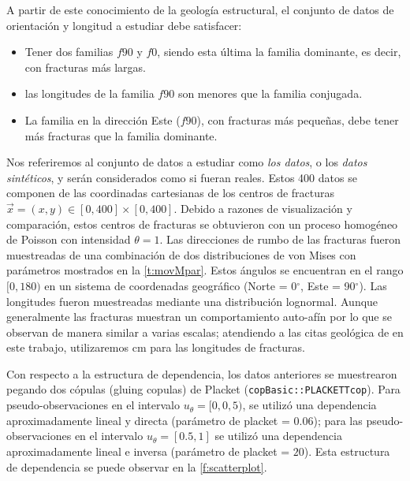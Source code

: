 A partir de este conocimiento de la geolog\'ia estructural, el conjunto de datos de orientaci\'on y longitud a estudiar debe satisfacer:

\begin{itemize}
	\item Tener dos familias $f90$ y $f0$, siendo esta \'ultima la familia dominante, es decir, con fracturas m\'as largas.
	\item las longitudes de la familia $f90$ son menores que la familia conjugada.
	\item La familia en la direcci\'on Este ($f90$), con fracturas m\'as peque\~nas, debe tener m\'as fracturas que la familia dominante.
\end{itemize}

Nos referiremos al conjunto de datos a estudiar como \textit{los datos}, o los \textit{datos sint\'eticos}, y ser\'an considerados como si fueran reales. Estos 400 datos se componen de las coordinadas cartesianas de los centros de fracturas $\vec{x} = (x,y) \in [0,400] \times [0,400]$.
Debido a razones de visualizaci\'on y comparaci\'on, estos centros de fracturas se obtuvieron con un proceso homog\'eneo de Poisson con intensidad $\theta = 1$.
Las direcciones de rumbo de las fracturas fueron muestreadas de una combinaci\'on de dos distribuciones de von Mises con par\'ametros mostrados en la \autoref{t:movMpar}.
Estos \'angulos se encuentran en el rango $[0, 180)$ en un sistema de coordenadas geogr\'afico (Norte = 0$^{\circ}$, Este = 90$^{\circ}$).
Las longitudes fueron muestreadas mediante una distribuci\'on lognormal.
Aunque generalmente las fracturas muestran un comportamiento auto-af\'in por lo que se observan de manera similar a varias escalas; atendiendo a las citas geol\'ogica de \citet{davis_structural_2011} en este trabajo, utilizaremos cm para las longitudes de fracturas.

Con respecto a la estructura de dependencia, los datos anteriores se muestrearon pegando dos c\'opulas (gluing copulas) de Placket (\verb|copBasic::PLACKETTcop|). Para pseudo-observaciones en el intervalo $u_{\theta} = [0, 0,5)$, se utiliz\'o una dependencia aproximadamente lineal y directa (par\'ametro de placket = $0.06$); para las pseudo-observaciones en el intervalo $u_{\theta} = [0.5, 1]$ se utiliz\'o una dependencia aproximadamente lineal e inversa (par\'ametro de placket = $20$). Esta estructura de dependencia se puede observar en la \autoref{f:scatterplot}.

